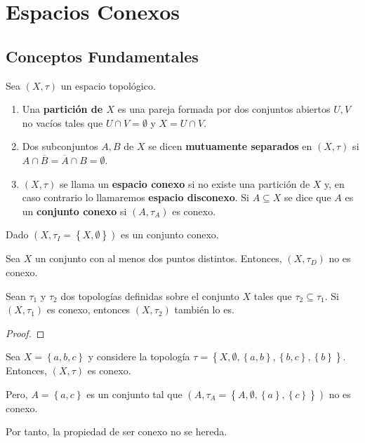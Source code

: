 \documentclass[12pt]{report}
\theoremstyle{largebreak}
\newcommand{\Cls}[1]{\ensuremath{\overline{#1}}}
\begin{document}
    \chapter{Espacios Conexos}

    \section{Conceptos Fundamentales}

    \renewcommand{\theenumi}{\alph{enumi}}

    \begin{mydef}
        Sea $(X,\tau)$ un espacio topológico.
        \begin{enumerate}
            \item Una \textbf{partición de $X$} es una pareja formada por dos conjuntos abiertos $U,V$ no vacíos tales que $U\cap V=\emptyset$ y $X=U\cap V$.
            \item Dos subconjuntos $A,B$ de $X$ se dicen \textbf{mutuamente separados} en $(X,\tau)$ si $A\cap\Cls{B}=\Cls{A}\cap B=\emptyset$.
            \item $(X,\tau)$ se llama un \textbf{espacio conexo} si no existe una partición de $X$ y, en caso contrario lo llamaremos \textbf{espacio disconexo}. Si $A\subseteq X$ se dice que $A$ es un \textbf{conjunto conexo} si $(A,\tau_A)$ es conexo.
        \end{enumerate}
    \end{mydef}

    \begin{exa}
        Dado $(X,\tau_I=\left\{X,\emptyset \right\})$ es un conjunto conexo.
    \end{exa}

    \begin{exa}
        Sea $X$ un conjunto con al menos dos puntos distintos. Entonces, $(X,\tau_D)$ no es conexo.
    \end{exa}

    \begin{exa}
        Sean $\tau_1$ y $\tau_2$ dos topologías definidas sobre el conjunto $X$ tales que $\tau_2\subseteq\tau_1$. Si $(X,\tau_1)$ es conexo, entonces $(X,\tau_2)$ también lo es.
    \end{exa}

    \begin{proof}
        
    \end{proof}

    \begin{exa}
        Sea $X=\left\{a,b,c\right\}$ y considere la topología $\tau=\left\{X,\emptyset,\left\{a,b\right\},\left\{b,c \right\},\left\{b\right\} \right\}$. Entonces, $(X,\tau)$ es conexo.

        Pero, $A=\left\{a,c\right\}$ es un conjunto tal que $(A,\tau_A=\left\{A,\emptyset,\left\{a\right\},\left\{c\right\} \right\})$ no es conexo.

        Por tanto, la propiedad de ser conexo no se hereda.
    \end{exa}
\end{document}
